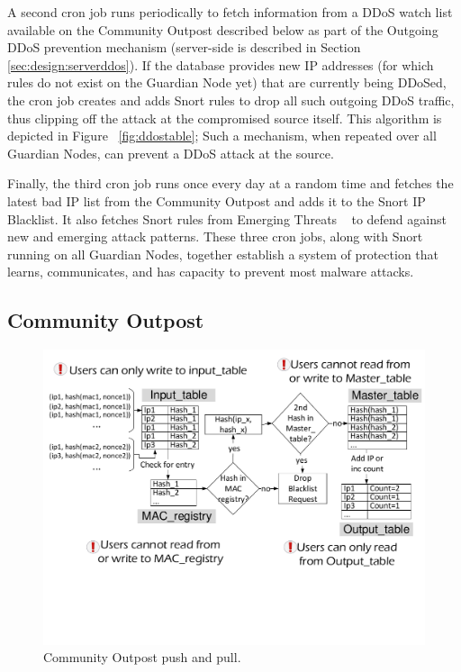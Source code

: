 A second cron job runs periodically to fetch information from a DDoS watch list available on the Community Outpost described below as part of the Outgoing DDoS prevention mechanism (server-side is described in Section \ref{sec:design:serverddos}). If the database provides new IP addresses (for which rules do not exist on the Guardian Node yet) that are currently being DDoSed, the cron job creates and adds Snort rules to drop all such outgoing DDoS traffic, thus clipping off the attack at the compromised source itself. 
This algorithm is depicted in Figure ~\ref{fig:ddostable}; Such a mechanism, when repeated over all Guardian Nodes, can prevent a DDoS attack at the source.

Finally, the third cron job runs once every day at a random time and fetches the latest bad IP list from the Community Outpost and adds it to the Snort IP Blacklist. It also fetches Snort rules from Emerging Threats ~\cite{emerging} to defend against new and emerging attack patterns. These three cron jobs, along with Snort running on all Guardian Nodes, together establish a system of protection that learns, communicates, and has capacity to prevent most malware attacks.

\subsection{Community Outpost}
\label{sec:design:server}

\begin{figure}
    \centering
    \includegraphics[width=0.95\linewidth]{figs/blacklistserver.pdf}
    \caption{Community Outpost push and pull.}
    \label{fig:blacklistserver}
\end{figure}

